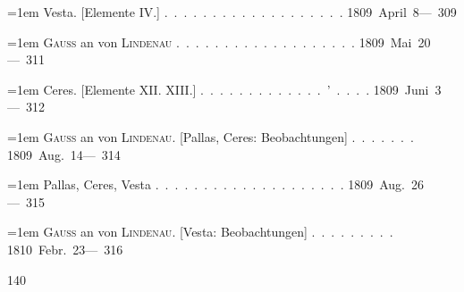 \noindent\hangindent=1em Vesta. [Elemente IV.] \mbox{.\ .\ .\ .\ .\ .\ .\ .\ .\ .\ .\ .\ .\ .\ .\ .\ .\ .\ .} \hfill\mbox{1809 April 8}\quad\mbox{--- 309}\par\smallskip
\noindent\hangindent=1em \textsc{Gauss} an von \textsc{Lindenau} \mbox{.\ .\ .\ .\ .\ .\ .\ .\ .\ .\ .\ .\ .\ .\ .\ .\ .\ .\ .} \hfill\mbox{1809 Mai 20}\quad\mbox{--- 311}\par\smallskip
\noindent\hangindent=1em Ceres. [Elemente XII. XIII.] \mbox{.\ .\ .\ .\ .\ .\ .\ .\ .\ .\ .\ .\ .\ '\ .\ .\ .\ .} \hfill\mbox{1809 Juni 3}\quad\mbox{--- 312}\par\smallskip
\noindent\hangindent=1em \textsc{Gauss} an von \textsc{Lindenau}. [Pallas, Ceres: Beobachtungen] \mbox{.\ .\ .\ .\ .\ .\ .} \hfill\mbox{1809 Aug. 14}\quad\mbox{--- 314}\par\smallskip
\noindent\hangindent=1em Pallas, Ceres, Vesta \mbox{.\ .\ .\ .\ .\ .\ .\ .\ .\ .\ .\ .\ .\ .\ .\ .\ .\ .\ .\ .} \hfill\mbox{1809 Aug. 26}\quad\mbox{--- 315}\par\smallskip
\noindent\hangindent=1em \textsc{Gauss} an von \textsc{Lindenau}. [Vesta: Beobachtungen] \mbox{.\ .\ .\ .\ .\ .\ .\ .\ .} \hfill\mbox{1810 Febr. 23}\quad\mbox{--- 316}\par\smallskip
\endgroup
\par\vfill
{}\hfill{\small 140}\hspace*{.18\textwidth}\par
